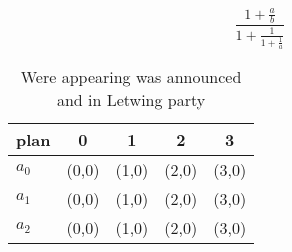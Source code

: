 \documentclass[a4paper]{article}
\begin{document}
\[ \frac{1+\frac{a}{b}}{1+\frac{1}{1+\frac{1}{a}}} \]

\begin{table}
\begin{adjustbox}{width=0.6\columnwidth}
\begin{tabular}{|l|l|l|l|l|}
\hline
\textbf{plan} & \multicolumn{1}{c|}{\textbf{0}} & \multicolumn{1}{c|}{\textbf{1}} & \multicolumn{1}{c|}{\textbf{2}} & \multicolumn{1}{c|}{\textbf{3}} \\ \hline
\textbf{$a_0$}  & (0,0) & (1,0) & (2,0) & (3,0) \\ \hline
\textbf{$a_1$}  & (0,0) & (1,0) & (2,0) & (3,0) \\ \hline
\textbf{$a_2$}  & (0,0) & (1,0) & (2,0) & (3,0) \\ \hline
\end{tabular}
\end{adjustbox}
\caption{Were appearing was announced and in Letwing party
}
\end{table}
\end{document}
